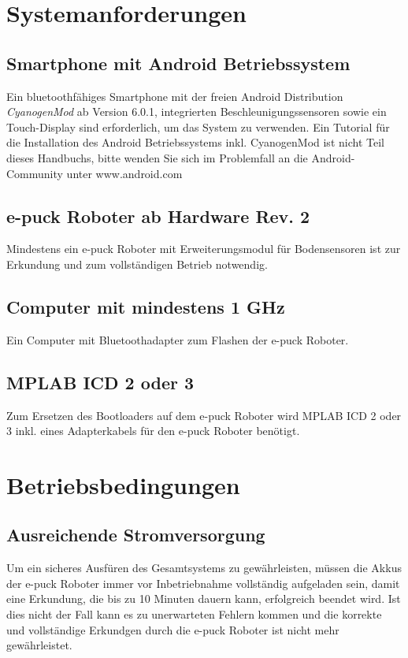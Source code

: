 \documentclass[10pt,a4paper]{article}
\let\oldsection\section
\renewcommand{\section}{\newpage \oldsection}
\begin{document}
\section{Systemanforderungen}
		\subsection{Smartphone mit Android Betriebssystem} 
				Ein bluetoothf\"ahiges Smartphone mit der freien Android Distribution \textit{CyanogenMod} ab Version 6.0.1, integrierten 
				Beschleunigungssensoren sowie ein Touch-Display sind erforderlich, um das System zu verwenden. Ein Tutorial f\"ur die Installation des Android 
				Betriebssystems inkl. CyanogenMod ist nicht Teil dieses Handbuchs, bitte wenden Sie sich im Problemfall an die Android-Community unter 
				www.android.com
		\subsection{e-puck Roboter ab Hardware Rev. 2} 
				Mindestens ein e-puck Roboter mit Erweiterungsmodul f\"ur Bodensensoren ist zur Erkundung und zum vollst\"andigen Betrieb notwendig.
		\subsection{Computer mit mindestens 1 GHz} 
				Ein Computer mit Bluetoothadapter zum Flashen der e-puck Roboter.
		\subsection{MPLAB ICD 2 oder 3} 
				Zum Ersetzen des Bootloaders auf dem e-puck Roboter wird MPLAB ICD 2 oder 3 inkl. eines Adapterkabels f\"ur den e-puck Roboter ben\"otigt.
\section{Betriebsbedingungen} 
		\subsection{Ausreichende Stromversorgung} 
		\label{stromversorgung}
				Um ein sicheres Ausf\"uren des Gesamtsystems zu gew\"ahrleisten, m\"ussen die Akkus der e-puck Roboter immer vor Inbetriebnahme vollst\"andig
				aufgeladen sein, damit eine Erkundung, die bis zu 10 Minuten dauern kann, erfolgreich beendet wird. Ist dies nicht der Fall kann es zu unerwarteten 
				Fehlern kommen und die korrekte und vollst\"andige Erkundgen durch die e-puck Roboter ist nicht mehr gew\"ahrleistet.
\end{document}
